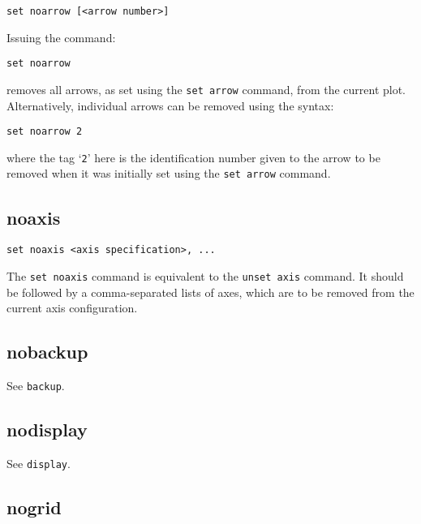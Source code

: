 \begin{verbatim}
set noarrow [<arrow number>]
\end{verbatim}

Issuing the command:

\begin{verbatim}
set noarrow
\end{verbatim}

\noindent removes all arrows, as set using the {\tt set arrow} command, from the current
plot. Alternatively, individual arrows can be removed using the syntax:

\begin{verbatim}
set noarrow 2
\end{verbatim}

\noindent where the tag `{\tt 2}' here is the identification number given to
the arrow to be removed when it was initially set using the {\tt set arrow}
command.

\subsection{noaxis}

\begin{verbatim}
set noaxis <axis specification>, ...
\end{verbatim}

The {\tt set noaxis} command is equivalent to the {\tt unset axis} command. It
should be followed by a comma-separated lists of axes, which are to be removed
from the current axis configuration.


\subsection{nobackup}

See {\tt backup}.


\subsection{nodisplay}

See {\tt display}.


\subsection{nogrid}

